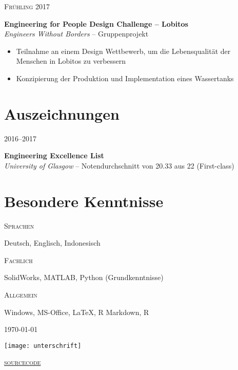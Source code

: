 \documentclass[a4paper]{article}
\newcommand{\entry}[4]{

	\begin{minipage}[t]{.20\textwidth}
		\hfill \textsc{#1}

	\end{minipage}
	\hfill\vline\hfill
	\begin{minipage}[t]{.75\textwidth}
		\textbf{#2}\\ 
		\textit{#3}    
		#4

	\end{minipage} 
	\vspace{.25cm}

}
\newcommand{\nentry}[2]{

	\begin{minipage}[t]{.20\textwidth}
		\hfill \textsc{#1}

	\end{minipage}
	\hfill\vline\hfill
	\begin{minipage}[t]{.75\textwidth}
		#2 

	\end{minipage}
	\vspace{.25cm} 

}
\begin{document}
\entry{Fr{\"u}hling 2017}{Engineering for People Design Challenge -- Lobitos}{Engineers Without Borders}{-- Gruppenprojekt\vspace{-.25cm}
	\begin{itemize}[leftmargin=*]
		\setlength{\itemsep}{-3pt}
	\item Teilnahme an einem Design Wettbewerb, um die Lebensqualit{\"a}t der \newline\phantom{W}Menschen in Lobitos zu verbessern
	\item Konzipierung der Produktion und Implementation eines Wassertanks
	\end{itemize}
}

\section{Auszeichnungen}

\entry{2016--2017}{Engineering Excellence List}{University of Glasgow}{-- Notendurchschnitt von 20.33 aus 22 (First-class)}

\section{Besondere Kenntnisse}

\nentry{Sprachen}{Deutsch, Englisch, Indonesisch}

\nentry{Fachlich}{SolidWorks, MATLAB, Python \hfill (Grundkenntnisse)}

\nentry{Allgemein}{Windows, MS-Office, {\LaTeX}, R Markdown, R}

\vspace*{\fill} 
\begin{minipage}{0.4\textwidth}
	\today
\end{minipage}
\begin{minipage}{0.19\textwidth}
	\centering
	\hspace{-50mm}\texttt{[image: unterschrift]}
\end{minipage}
\begin{minipage}{0.4\textwidth}
	\flushright
	\href{https://github.com/emfiedler/cv/blob/master/CV.tex}{\textsc{sourcecode}}
\end{minipage}
\end{document}
